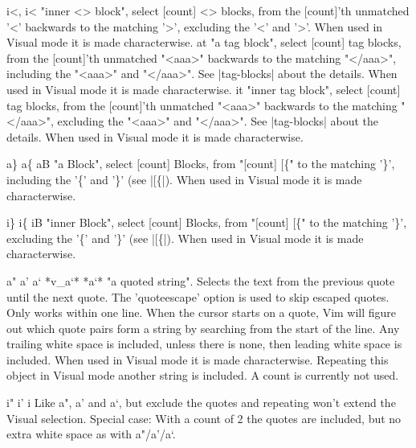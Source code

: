 \documentclass{beamer}
\begin{document}
\begin{frame}
            i<, i<			"inner <> block", select [count] <> blocks, from
            the [count]'th unmatched '<' backwards to the matching
            '>', excluding the '<' and '>'.
            When used in Visual mode it is made characterwise.
            at			"a tag block", select [count] tag blocks, from the
            [count]'th unmatched "<aaa>" backwards to the matching
            "</aaa>", including the "<aaa>" and "</aaa>".
            See |tag-blocks| about the details.
            When used in Visual mode it is made characterwise.
            it			"inner tag block", select [count] tag blocks, from the
            [count]'th unmatched "<aaa>" backwards to the matching
            "</aaa>", excluding the "<aaa>" and "</aaa>".
            See |tag-blocks| about the details.
            When used in Visual mode it is made characterwise.

          a\} a\{	aB			"a Block", select [count] Blocks, from "[count] [\{" to
              the matching '\}', including the '\{' and '\}' (see
              |[\{|).
                  When used in Visual mode it is made characterwise.

                i\}			i\{	iB			"inner Block", select [count] Blocks, from "[count] [\{"
                    to the matching '\}', excluding the '\{' and '\}' (see
                    |[\{|).
                        When used in Visual mode it is made characterwise.

                        a" a'	a`							*v\_a`* *a`*
                        "a quoted string".  Selects the text from the previous
                        quote until the next quote.  The 'quoteescape' option
                        is used to skip escaped quotes.
                        Only works within one line.
                        When the cursor starts on a quote, Vim will figure out
                        which quote pairs form a string by searching from the
                        start of the line.
                        Any trailing white space is included, unless there is
                        none, then leading white space is included.
                        When used in Visual mode it is made characterwise.
                        Repeating this object in Visual mode another string is
                        included.  A count is currently not used.

                        i" i'	i
                        Like a", a' and a`, but exclude the quotes and
                        repeating won't extend the Visual selection.
                        Special case: With a count of 2 the quotes are
                        included, but no extra white space as with a"/a'/a`.


                      \end{frame}
\end{document}

